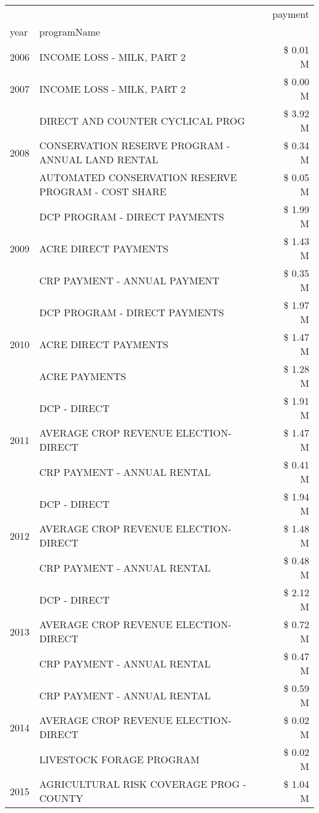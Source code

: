 \begin{tabular}{llr}
\toprule
 &  & payment \\
year & programName &  \\
\midrule
2006 & INCOME LOSS - MILK, PART 2 & \$ 0.01 M \\
\cline{1-3}
2007 & INCOME LOSS - MILK, PART 2 & \$ 0.00 M \\
\cline{1-3}
\multirow[t]{3}{*}{2008} & DIRECT AND COUNTER CYCLICAL PROG & \$ 3.92 M \\
 & CONSERVATION RESERVE PROGRAM - ANNUAL LAND RENTAL & \$ 0.34 M \\
 & AUTOMATED CONSERVATION RESERVE PROGRAM - COST SHARE & \$ 0.05 M \\
\cline{1-3}
\multirow[t]{3}{*}{2009} & DCP PROGRAM - DIRECT PAYMENTS & \$ 1.99 M \\
 & ACRE DIRECT PAYMENTS & \$ 1.43 M \\
 & CRP PAYMENT - ANNUAL PAYMENT & \$ 0.35 M \\
\cline{1-3}
\multirow[t]{3}{*}{2010} & DCP PROGRAM - DIRECT PAYMENTS & \$ 1.97 M \\
 & ACRE DIRECT PAYMENTS & \$ 1.47 M \\
 & ACRE PAYMENTS & \$ 1.28 M \\
\cline{1-3}
\multirow[t]{3}{*}{2011} & DCP - DIRECT & \$ 1.91 M \\
 & AVERAGE CROP REVENUE ELECTION-DIRECT & \$ 1.47 M \\
 & CRP PAYMENT - ANNUAL RENTAL & \$ 0.41 M \\
\cline{1-3}
\multirow[t]{3}{*}{2012} & DCP - DIRECT & \$ 1.94 M \\
 & AVERAGE CROP REVENUE ELECTION-DIRECT & \$ 1.48 M \\
 & CRP PAYMENT - ANNUAL RENTAL & \$ 0.48 M \\
\cline{1-3}
\multirow[t]{3}{*}{2013} & DCP - DIRECT & \$ 2.12 M \\
 & AVERAGE CROP REVENUE ELECTION-DIRECT & \$ 0.72 M \\
 & CRP PAYMENT - ANNUAL RENTAL & \$ 0.47 M \\
\cline{1-3}
\multirow[t]{3}{*}{2014} & CRP PAYMENT - ANNUAL RENTAL & \$ 0.59 M \\
 & AVERAGE CROP REVENUE ELECTION-DIRECT & \$ 0.02 M \\
 & LIVESTOCK FORAGE PROGRAM & \$ 0.02 M \\
\cline{1-3}
\multirow[t]{3}{*}{2015} & AGRICULTURAL RISK COVERAGE PROG - COUNTY & \$ 1.04 M \\

\end{tabular}
